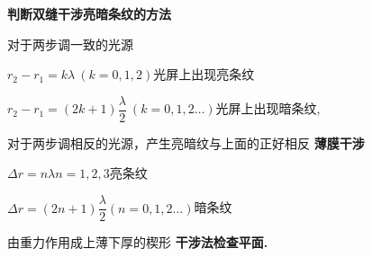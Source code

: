 \textbf{判断双缝干涉亮暗条纹的方法}


对于两步调一致的光源 %

$r_2-r_1=k\lambda\ (k=0,1,2)$\quad 光屏上出现亮条纹 %

$r_2-r_1=(2k+1)\dfrac{\lambda}{2}\ (k=0,1,2\ldots)$\quad 光屏上出现暗条纹,

对于两步调相反的光源，产生亮暗纹与上面的正好相反
\textbf{薄膜干涉}


$\Delta r=n\lambda$\quad $n=1,2,3$\quad 亮条纹

$\Delta r=(2n+1)\dfrac{\lambda}{2}$\quad $(n=0,1,2\ldots)$\quad 暗条纹

由重力作用成上薄下厚的楔形
\textbf{干涉法检查平面.}


